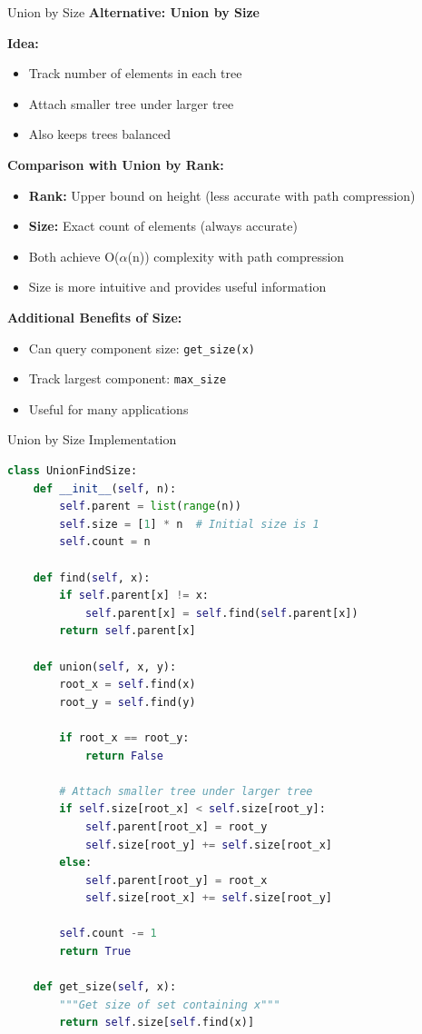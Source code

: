 \documentclass[aspectratio=169]{beamer}
\begin{document}
\begin{frame}{Union by Size}
  \textbf{Alternative: Union by Size}

  \vspace{0.3cm}
  \textbf{Idea:}
  \begin{itemize}
    \item Track number of elements in each tree
    \item Attach smaller tree under larger tree
    \item Also keeps trees balanced
  \end{itemize}

  \vspace{0.5cm}
  \textbf{Comparison with Union by Rank:}
  \begin{itemize}
    \item \textbf{Rank:} Upper bound on height (less accurate with path compression)
    \item \textbf{Size:} Exact count of elements (always accurate)
    \item Both achieve O($\alpha$(n)) complexity with path compression
    \item Size is more intuitive and provides useful information
  \end{itemize}

  \vspace{0.5cm}
  \textbf{Additional Benefits of Size:}
  \begin{itemize}
    \item Can query component size: \texttt{get\_size(x)}
    \item Track largest component: \texttt{max\_size}
    \item Useful for many applications
  \end{itemize}
\end{frame}

\begin{frame}[fragile]{Union by Size Implementation}
  \begin{lstlisting}[language=Python, basicstyle=\ttfamily\footnotesize]
class UnionFindSize:
    def __init__(self, n):
        self.parent = list(range(n))
        self.size = [1] * n  # Initial size is 1
        self.count = n

    def find(self, x):
        if self.parent[x] != x:
            self.parent[x] = self.find(self.parent[x])
        return self.parent[x]

    def union(self, x, y):
        root_x = self.find(x)
        root_y = self.find(y)

        if root_x == root_y:
            return False

        # Attach smaller tree under larger tree
        if self.size[root_x] < self.size[root_y]:
            self.parent[root_x] = root_y
            self.size[root_y] += self.size[root_x]
        else:
            self.parent[root_y] = root_x
            self.size[root_x] += self.size[root_y]

        self.count -= 1
        return True

    def get_size(self, x):
        """Get size of set containing x"""
        return self.size[self.find(x)]
  \end{lstlisting}
\end{frame}
\end{document}
